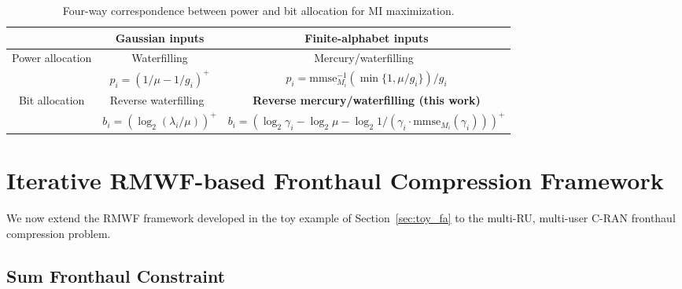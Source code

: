 \documentclass[10pt, twocolumn, comsoc]{IEEEtran}
\begin{document}
\begin{table}[t]
\centering
\caption{Four-way correspondence between power and bit allocation for MI maximization.}
\label{tab:correspondence}
\renewcommand{\arraystretch}{1.5}
\begin{tabular*}{0.85\textwidth}{@{\extracolsep{\fill}} c|cc @{}}
\toprule
 & Gaussian inputs & Finite-alphabet inputs \\
\midrule
Power allocation & Waterfilling & Mercury/waterfilling~\cite{LozanoTulinoVerdu} \\
 & $p_i = \left(1/\mu - 1/g_i\right)^+$ 
 & $p_i = \mathrm{mmse}_{M_i}^{-1}\left(\min\{1, \mu/g_i\}\right) / g_i$ \\
Bit allocation & Reverse waterfilling~\cite{CoverThomas} & \textbf{Reverse mercury/waterfilling (this work)} \\
 & $b_i = \left(\log_2\left(\lambda_i/\mu\right)\right)^+$ 
 & $b_i = \left(\log_2{\gamma_i} - \log_2{\mu} - \log_2{1/(\gamma_i\cdot \mathrm{mmse}_{M_i}(\gamma_i))}\right)^+$ 
 \\
\bottomrule
\end{tabular*}
\end{table}




\section{Iterative RMWF-based Fronthaul Compression Framework}
\label{sec:rmwf}

We now extend the RMWF framework developed in the toy example of Section~\ref{sec:toy_fa} to the multi-RU, multi-user C-RAN fronthaul compression problem.

\subsection{Sum Fronthaul Constraint}
\end{document}
